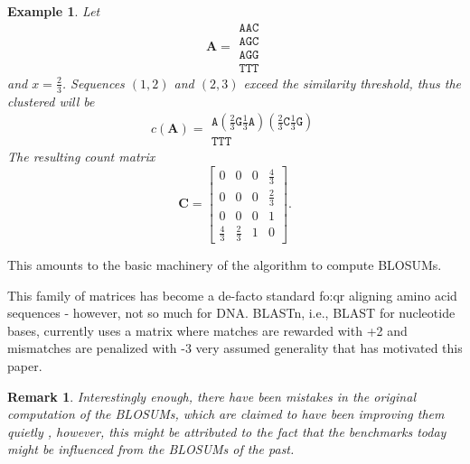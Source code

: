 \documentclass{article}
\newtheorem{example}{Example}
\newtheorem{remark}{Remark}
\begin{document}
\begin{example}
	Let
	\begin{equation*}
		\mathbf A = \begin{matrix}
			\mathtt{AAC} \\
			\mathtt{AGC} \\
			\mathtt{AGG} \\
			\mathtt{TTT}
		\end{matrix}	
	\end{equation*}
	and $x = \frac 2 3$. Sequences $(1, 2)$ and $(2, 3)$ exceed the similarity threshold,
	thus the clustered  will be
	\begin{equation*}
		c(\mathbf A) = \begin{matrix}
		\mathtt{A}(\frac 2 3 \mathtt G \frac 1 3 \mathtt A)(\frac 2 3 \mathtt C \frac 1 3 \mathtt G) \\	
		\mathtt{TTT}
		\end{matrix} 	
	\end{equation*}
	The resulting count matrix 
	\begin{equation*}
			\mathbf C = \begin{bmatrix}
			0 & 0 & 0 & \frac 4 3 \\
			0 & 0 & 0 & \frac 2 3 \\
			0 & 0 & 0 & 1 \\
			\frac 4 3 & \frac 2 3 & 1 & 0
		\end{bmatrix}.
	\end{equation*}
\end{example}
This amounts to the basic machinery of the algorithm to compute BLOSUMs.

This family of matrices has become a de-facto standard fo:qr aligning amino acid
sequences - however, not so much for DNA. BLASTn, i.e., BLAST for nucleotide bases, currently uses a matrix where
matches are rewarded with +2 and mismatches are penalized with -3 \cite{altschulBasicLocalAlignment1990}
very assumed generality that has motivated this paper.

\begin{remark}
Interestingly enough, there have been
mistakes in the original computation of the BLOSUMs, which are claimed
to have been improving them quietly \cite{styczynskiBLOSUM62MiscalculationsImprove2008a}, however, this might be attributed to the
fact that the benchmarks today might be influenced from the BLOSUMs of the past.

\end{remark}
\end{document}
